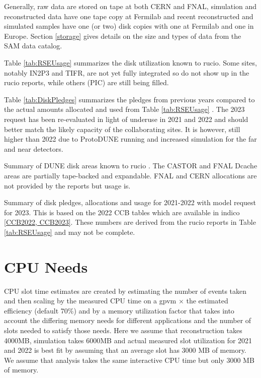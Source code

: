 \documentclass[12pt]{article}
\begin{document}
Generally, raw data are stored on tape at both CERN and FNAL, simulation and reconstructed data  have one tape copy at Fermilab and recent reconstructed and simulated samples have one (or two) disk copies with one at Fermilab and one in Europe.  Section \ref{storage} gives details on the size and types of data from the SAM data catalog.

Table \ref{tab:RSEUsage} summarizes the disk utilization known to rucio.  Some sites, notably IN2P3 and TIFR, are not yet fully integrated so do not show up in the rucio reports, while others (PIC) are still being filled.

Table \ref{tab:DiskPledges} summarizes the pledges from previous years compared to the actual amounts allocated and used from Table \ref{tab:RSEUsage} .   The 2023 request has been re-evaluated in light of underuse in 2021 and 2022 and should better match the likely capacity of the collaborating sites.  It is however, still higher than 2022 due to ProtoDUNE running and increased simulation for the far and near detectors. 

\begin{table}[ht]
\centering{}
 \label{tab:RSEUsage}
\caption{Summary  of DUNE disk areas known to rucio \cite{scotgrid}.  The CASTOR and FNAL Dcache areas are partially tape-backed and expandable. FNAL and CERN allocations are not provided by the reports but usage is.  }
\end{table}


\begin{table}[ht]
\centering{}
 \label{tab:DiskPledges}
\caption{Summary of disk pledges, allocations and usage for 2021-2022 with model request for 2023.  This is based on the 2022 CCB tables which are available in indico  \ref{CCB2022, CCB2023}.  These numbers are derived from the rucio reports in Table \ref{tab:RSEUsage} and may not be complete. }
\end{table}




\section{CPU Needs}

CPU  slot time estimates are created by estimating the number of events taken and then scaling by the measured CPU time on a gpvm $\times$ the estimated efficiency (default 70\%) and by a memory utilization factor that takes into account the differing memory needs for different applications and the number of slots needed to satisfy those needs.  Here we assume that reconstruction takes 4000MB, simulation takes 6000MB and actual measured  slot utilization for 2021 and 2022 is best fit by assuming that an average slot has 3000 MB of memory.    We assume that analysis takes the same interactive CPU time but only 3000 MB of memory.  
\end{document}

